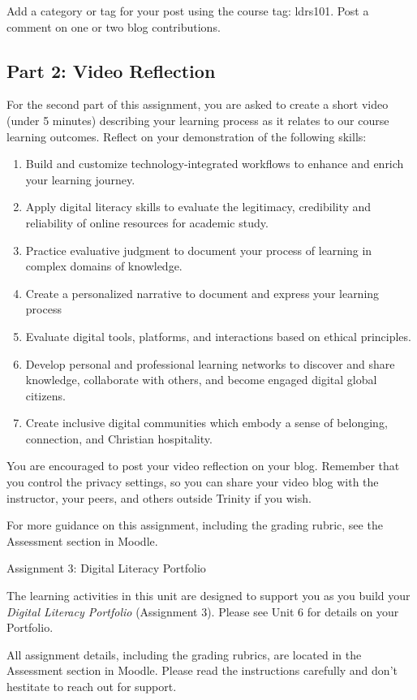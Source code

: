 \documentclass[
]{book}
\providecommand{\tightlist}{%
  \setlength{\itemsep}{0pt}\setlength{\parskip}{0pt}}
\theoremstyle{definition}
\theoremstyle{definition}
\theoremstyle{definition}
\theoremstyle{definition}
\theoremstyle{remark}
\begin{document}
\begin{assessment}
Add a category or tag for your post using the course tag: ldrs101. Post a comment on one or two blog contributions.

\hypertarget{part-2-video-reflection}{%
\subsection*{Part 2: Video Reflection}\label{part-2-video-reflection}}

For the second part of this assignment, you are asked to create a short video (under 5 minutes) describing your learning process as it relates to our course learning outcomes. Reflect on your demonstration of the following skills:

\begin{enumerate}
\def\labelenumi{\arabic{enumi}.}
\tightlist
\item
  Build and customize technology-integrated workflows to enhance and enrich your learning journey.
\item
  Apply digital literacy skills to evaluate the legitimacy, credibility and reliability of online resources for academic study.
\item
  Practice evaluative judgment to document your process of learning in complex domains of knowledge.
\item
  Create a personalized narrative to document and express your learning process
\item
  Evaluate digital tools, platforms, and interactions based on ethical principles.
\item
  Develop personal and professional learning networks to discover and share knowledge, collaborate with others, and become engaged digital global citizens.
\item
  Create inclusive digital communities which embody a sense of belonging, connection, and Christian hospitality.
\end{enumerate}

You are encouraged to post your video reflection on your blog. Remember that you control the privacy settings, so you can share your video blog with the instructor, your peers, and others outside Trinity if you wish.

For more guidance on this assignment, including the grading rubric, see the Assessment section in Moodle.
\end{assessment}

\begin{assessment}
{Assignment 3: Digital Literacy Portfolio}

The learning activities in this unit are designed to support you as you build your \emph{Digital Literacy Portfolio} (Assignment 3). Please see Unit 6 for details on your Portfolio.

All assignment details, including the grading rubrics, are located in the Assessment section in Moodle. Please read the instructions carefully and don't hestitate to reach out for support.
\end{assessment}
\end{document}
